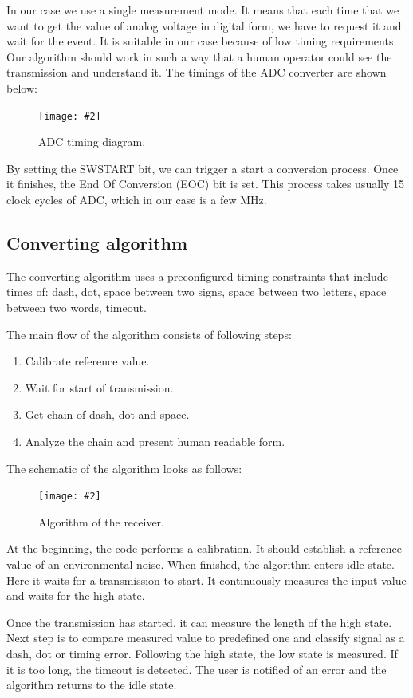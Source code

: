 \documentclass[12pt]{article}
\newcommand{\image}[3]{
\begin{figure}[h]
	\begin{center}
		\texttt{[image: \#2]}
	\end{center}
  \caption{#1}
\end{figure}}
\begin{document}
  In our case we use a single measurement mode. It means that each time that we want to get the value of analog voltage in digital form, we have to request it and wait for the event.
  It is suitable in our case because of low timing requirements. Our algorithm should work in such a way that a human operator could see the transmission and understand it.
  The timings of the ADC converter are shown below:
  
  \image{ADC timing diagram.}{adc_internals.png}{0.4}
  By setting the SWSTART bit, we can trigger a start a conversion process. Once it finishes, the End Of Conversion (EOC) bit is set.
  This process takes usually 15 clock cycles of ADC, which in our case is a few MHz.

  \subsection{Converting algorithm}
  The converting algorithm uses a preconfigured timing constraints that include times of: dash, dot, space between two signs, space between two letters, space between two words, timeout.
  \vspace{10pt}

  The main flow of the algorithm consists of following steps:
  \begin{enumerate}
    \item Calibrate reference value.
    \item Wait for start of transmission.
    \item Get chain of dash, dot and space.
    \item Analyze the chain and present human readable form.
  \end{enumerate}
  The schematic of the algorithm looks as follows:
  \image{Algorithm of the receiver.}{algorithm_receiver.png}{0.4}

  At the beginning, the code performs a calibration. It should establish a reference value of an environmental noise.
  When finished, the algorithm enters idle state. Here it waits for a transmission to start. It continuously measures the input value and waits for the high state.

  Once the transmission has started, it can measure the length of the high state. Next step is to compare measured value to predefined one and classify signal as a dash, dot or timing error.
  Following the high state, the low state is measured. If it is too long, the timeout is detected. The user is notified of an error and the algorithm
  returns to the idle state.
\end{document}
